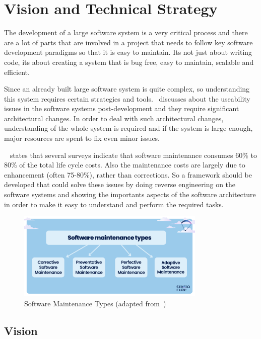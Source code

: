 \chapter{Vision and Technical Strategy}

The development of a large software system is a very critical process and there are a lot of parts that are involved in a project that needs to follow key software development paradigms so that it is easy to maintain. Its not just about writing code, its about creating a system that is bug free, easy to maintain, scalable and efficient.

Since an already built large software system is quite complex, so understanding this system requires certain strategies and tools.~\citep{Folmer2005} discusses about the useability issues in the software systems post-development and they require significant architectural changes. In order to deal with such architectural changes, understanding of the whole system is required and if the system is large enough, major resources are spent to fix even minor issues. 

~\citep{SeMaintainance2001} states that several surveys indicate that software maintenance consumes 60\% to 80\% of the total life cycle costs. Also the maintenance costs are largely due to enhancement (often 75{-}80\%), rather than corrections. So a framework should be developed that could solve these issues by doing reverse engineering on the software systems and showing the importants aspects of the software architecture in order to make it easy to understand and perform the required tasks.

\begin{figure}[ht]
    \centering
    \includegraphics[width=0.8\textwidth]{figures/se_maintenance.png}
    \caption[Software Maintenance Types]{Software Maintenance Types (adapted from~\cite{stratoflow2025})}
	\label{fig_se_maintenance}
\end{figure}

\section{Vision}\label{sec:vision}

